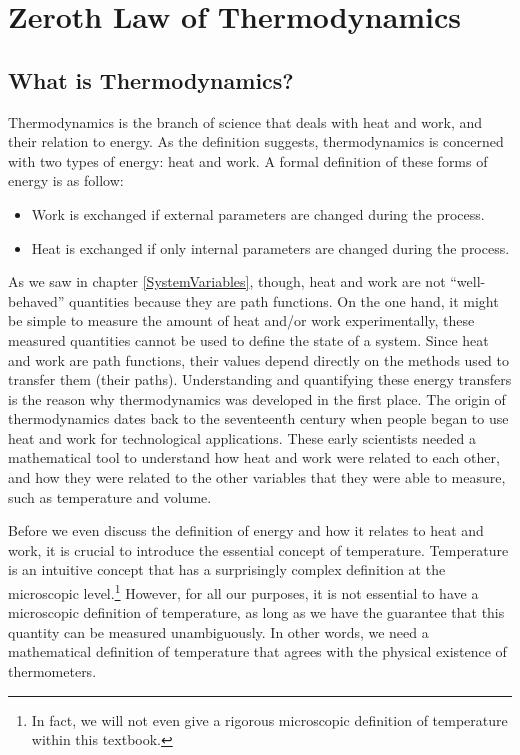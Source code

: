 \documentclass[
]{book}
\providecommand{\tightlist}{%
  \setlength{\itemsep}{0pt}\setlength{\parskip}{0pt}}
\theoremstyle{definition}
\theoremstyle{definition}
\theoremstyle{definition}
\theoremstyle{remark}
\begin{document}
\hypertarget{ZerothLaw}{%
\chapter{Zeroth Law of Thermodynamics}\label{ZerothLaw}}

\hypertarget{what-is-thermodynamics}{%
\section{What is Thermodynamics?}\label{what-is-thermodynamics}}

Thermodynamics is the branch of science that deals with heat and work, and their relation to energy. As the definition suggests, thermodynamics is concerned with two types of energy: heat and work. A formal definition of these forms of energy is as follow:

\begin{itemize}
\tightlist
\item
  Work is exchanged if external parameters are changed during the process.
\item
  Heat is exchanged if only internal parameters are changed during the process.
\end{itemize}

As we saw in chapter \ref{SystemVariables}, though, heat and work are not ``well-behaved'' quantities because they are path functions. On the one hand, it might be simple to measure the amount of heat and/or work experimentally, these measured quantities cannot be used to define the state of a system. Since heat and work are path functions, their values depend directly on the methods used to transfer them (their paths). Understanding and quantifying these energy transfers is the reason why thermodynamics was developed in the first place. The origin of thermodynamics dates back to the seventeenth century when people began to use heat and work for technological applications. These early scientists needed a mathematical tool to understand how heat and work were related to each other, and how they were related to the other variables that they were able to measure, such as temperature and volume.

Before we even discuss the definition of energy and how it relates to heat and work, it is crucial to introduce the essential concept of temperature. Temperature is an intuitive concept that has a surprisingly complex definition at the microscopic level.\footnote{In fact, we will not even give a rigorous microscopic definition of temperature within this textbook.} However, for all our purposes, it is not essential to have a microscopic definition of temperature, as long as we have the guarantee that this quantity can be measured unambiguously. In other words, we need a mathematical definition of temperature that agrees with the physical existence of thermometers.
\end{document}
